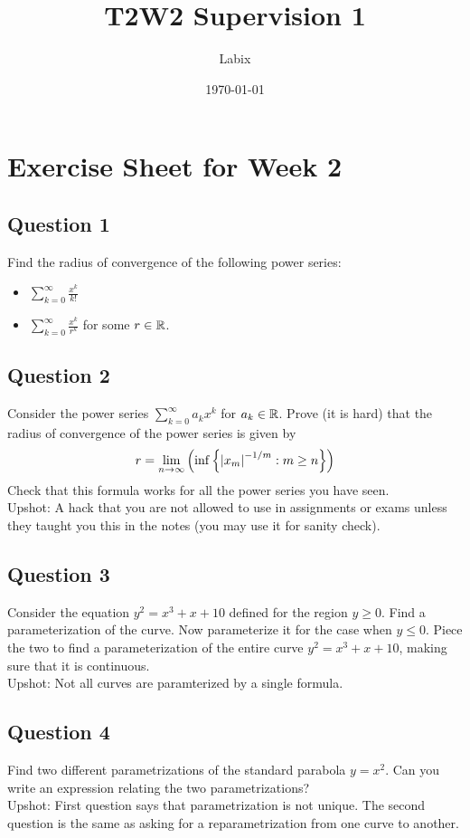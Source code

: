 \documentclass[a4paper]{article}
\title{T2W2 Supervision 1}
\author{Labix}
\date{\today}
\begin{document}
\section*{Exercise Sheet for Week 2}
\subsection*{Question 1}
Find the radius of convergence of the following power series: 
\begin{itemize}
\item $\sum_{k=0}^\infty\frac{x^k}{k!}$
\item $\sum_{k=0}^\infty\frac{x^k}{r^k}$ for some $r\in\mathbb{R}$. 
\end{itemize}

\subsection*{Question 2}
Consider the power series $\sum_{k=0}^\infty a_kx^k$ for $a_k\in\mathbb{R}$. Prove (it is hard) that the radius of convergence of the power series is given by $$r=\lim_{n\to\infty}\left(\inf\left\{\abs{x_m}^{-1/m}:m\geq n\right\}\right)$$ Check that this formula works for all the power series you have seen. \\

Upshot: A hack that you are not allowed to use in assignments or exams unless they taught you this in the notes (you may use it for sanity check). 

\subsection*{Question 3}
Consider the equation $y^2=x^3+x+10$ defined for the region $y\geq 0$. Find a parameterization of the curve. Now parameterize it for the case when $y\leq 0$. Piece the two to find a parameterization of the entire curve $y^2=x^3+x+10$, making sure that it is continuous. \\

Upshot: Not all curves are paramterized by a single formula. 

\subsection*{Question 4}
Find two different parametrizations of the standard parabola $y=x^2$. Can you write an expression relating the two parametrizations?\\

Upshot: First question says that parametrization is not unique. The second question is the same as asking for a reparametrization from one curve to another. 
\end{document}
